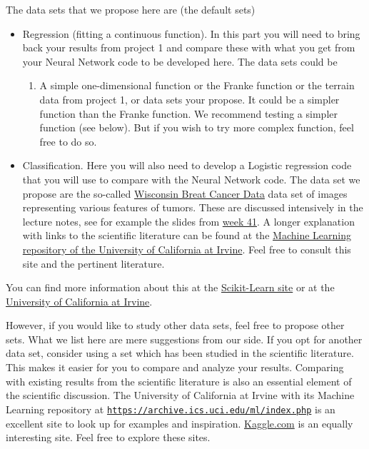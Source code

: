 \documentclass[%
oneside,                 %
final,                   %
10pt]{article}
\begin{document}
The data sets that we propose here are (the default sets)

\begin{itemize}
\item Regression (fitting a continuous function). In this part you will need to bring back your results from project 1 and compare these with what you get from your Neural Network code to be developed here. The data sets could be
\begin{enumerate}

 \item A simple one-dimensional function or the Franke function or the terrain data from project 1, or data sets your propose. It could be a simpler function than the Franke function. We recommend testing a simpler function (see below). But if you wish to try more complex function, feel free to do so.

\end{enumerate}

\noindent
\item Classification. Here you will also need to develop a Logistic regression code that you will use to compare with the Neural Network code. The data set we propose are the so-called \href{{https://www.kaggle.com/uciml/breast-cancer-wisconsin-data}}{Wisconsin Breat Cancer Data} data set of images representing various features of tumors. These are discussed intensively in the lecture notes, see for example the slides from \href{{https://compphysics.github.io/MachineLearning/doc/pub/week41/html/week41.html}}{week 41}. A longer explanation with links to the scientific literature can be found at the \href{{https://archive.ics.uci.edu/ml/datasets/Breast+Cancer+Wisconsin+%
\end{itemize}

\noindent
You can find more information about this at the \href{{https://scikit-learn.org/stable/modules/generated/sklearn.datasets.load_breast_cancer.html}}{Scikit-Learn site} or at the \href{{https://archive.ics.uci.edu/ml/datasets/breast+cancer+wisconsin+(original)}}{University of California at Irvine}. 

However, if you would like to study other data sets, feel free to
propose other sets. What we list here are mere suggestions from our
side. If you opt for another data set, consider using a set which has
been studied in the scientific literature. This makes it easier for
you to compare and analyze your results. Comparing with existing
results from the scientific literature is also an essential element of
the scientific discussion.  The University of California at Irvine
with its Machine Learning repository at
\href{{https://archive.ics.uci.edu/ml/index.php}}{\nolinkurl{https://archive.ics.uci.edu/ml/index.php}} is an excellent site to
look up for examples and
inspiration. \href{{https://www.kaggle.com/}}{Kaggle.com} is an equally
interesting site. Feel free to explore these sites.
\end{document}
